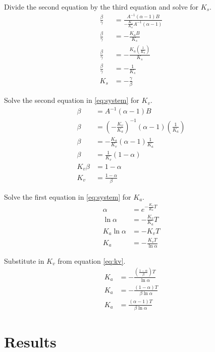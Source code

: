 \documentclass[10pt,conference,compsoc]{IEEEtran}
\begin{document}
Divide the second equation by the third equation and solve for $K_s$.
\begin{align}
  \frac{\beta}{\gamma} &= \frac{A^{-1} (\alpha - 1) B}
    {-\frac{K_s}{K_a} A^{-1} (\alpha - 1)} \nonumber \\
  \frac{\beta}{\gamma} &= -\frac{K_a B}{K_s} \nonumber \\
  \frac{\beta}{\gamma} &= -\frac{K_a \left(\frac{1}{K_a}\right)}{K_s} \nonumber
    \\
  \frac{\beta}{\gamma} &= -\frac{1}{K_s} \nonumber \\
  K_s &= -\frac{\gamma}{\beta}
\end{align}

Solve the second equation in \eqref{eq:system} for $K_v$.
\begin{align}
  \beta &= A^{-1} (\alpha - 1) B \nonumber \\
  \beta &= \left(-\frac{K_v}{K_a}\right)^{-1} (\alpha - 1)
    \left(\frac{1}{K_a}\right) \nonumber \\
  \beta &= -\frac{K_a}{K_v} (\alpha - 1) \frac{1}{K_a} \nonumber \\
  \beta &= \frac{1}{K_v} (1 - \alpha) \nonumber \\
  K_v \beta &= 1 - \alpha \nonumber \\
  K_v &= \frac{1 - \alpha}{\beta} \label{eq:kv}
\end{align}

Solve the first equation in \eqref{eq:system} for $K_a$.
\begin{align*}
  \alpha &= e^{-\frac{K_v}{K_a} T} \\
  \ln\alpha &= -\frac{K_v}{K_a} T \\
  K_a \ln\alpha &= -K_v T \\
  K_a &= -\frac{K_v T}{\ln\alpha}
\end{align*}

Substitute in $K_v$ from equation \eqref{eq:kv}.
\begin{align}
  K_a &= -\frac{\left(\frac{1 - \alpha}{\beta}\right) T}{\ln\alpha} \nonumber \\
  K_a &= -\frac{(1 - \alpha) T}{\beta \ln\alpha} \nonumber \\
  K_a &= \frac{(\alpha - 1) T}{\beta \ln\alpha}
\end{align}

\section{Results}
\end{document}
